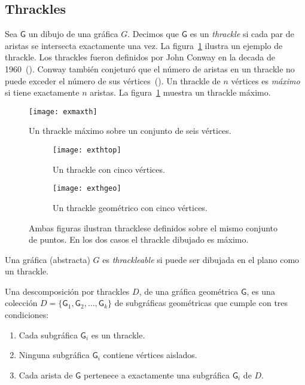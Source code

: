 \subsection{Thrackles}
Sea $\mathsf{G}$ un dibujo de una gráfica $G$. Decimos que $\mathsf{G}$ es un
\emph{thrackle} si cada par de aristas se intersecta exactamente una vez. La
figura~\ref{fig:exmaxth} ilustra un ejemplo de thrackle.
Los thrackles fueron definidos por John Conway en la decada de
1960~(\cite{Pach2013}). Conway también conjeturó que el número de aristas en un
thrackle no puede exceder el número de sus vértices~(\cite{Fulek2011}).
Un thrackle de $n$ vértices es \emph{máximo} si tiene exactamente
$n$ aristas. La figura~\ref{fig:exmaxth} muestra un thrackle máximo.

\begin{figure}[htpb]
  \centering
  \texttt{[image: exmaxth]}
  \caption{Un thrackle máximo sobre un conjunto de seis vértices.}
  \label{fig:exmaxth}
\end{figure}

\begin{figure}[htb]
  \centering
\begin{subfigure}[h]{.4\textwidth}
  \centering
  \texttt{[image: exthtop]}
  \caption{Un thrackle con cinco vértices.}
  \label{fig:exthtop}
\end{subfigure}\hfill%
\begin{subfigure}[h]{.4\textwidth}
  \centering
  \texttt{[image: exthgeo]}
  \caption{Un thrackle geométrico con cinco vértices.}
  \label{fig:exthgeo}
\end{subfigure}
\caption{Ambas figuras ilustran thracklese definidos sobre el mismo conjunto de
puntos. En los dos casos el thrackle dibujado es máximo.}
\label{fig:exthgeotop}
\end{figure}

Una gráfica (abstracta) $G$ es \emph{thrackleable} si puede ser dibujada en el plano como un thrackle.

Una descomposición por thrackles $D$, de una gráfica geométrica
$\mathsf{G}$, es una colección $D=\{\mathsf{G}_1,\mathsf{G}_2,\dots,\mathsf{G}_k\}$
de subgráficas geométricas que cumple con tres condiciones:
\begin{enumerate}
  \item Cada subgráfica $\mathsf{G}_i$ es un thrackle.
  \item Ninguna subgráfica $\mathsf{G}_i$ contiene vértices aislados.
  \item Cada arista de $\mathsf{G}$ pertenece a exactamente una subgráfica
  $\mathsf{G}_i$ de $D$.
\end{enumerate}

